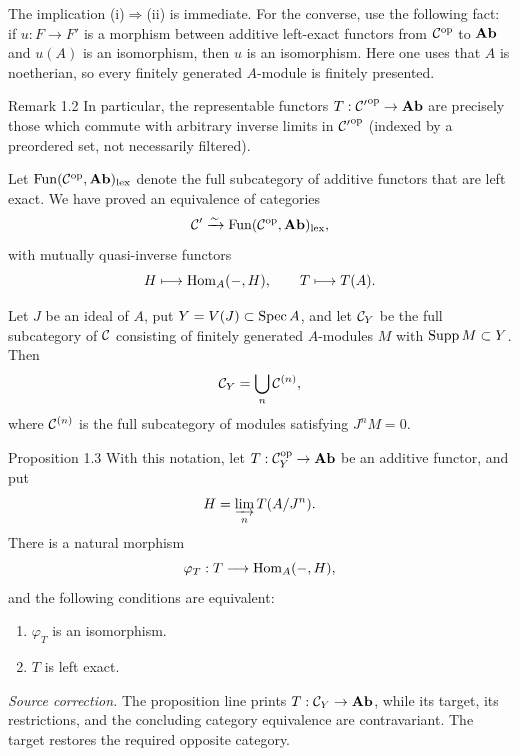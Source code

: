 The implication (i)$\Rightarrow$(ii) is immediate. For the converse, use the
following fact: if $u:F\to F'$ is a morphism between additive left-exact
functors from $\mathcal C^{\mathrm{op}}$ to $\mathbf{Ab}$ and $u(A)$ is an isomorphism,
then $u$ is an isomorphism. Here one uses that $A$ is noetherian, so every
finitely generated $A$-module is finitely presented.

\begin{sgastatement}{Remark 1.2}
In particular, the representable functors
$T:{\mathcal C'}^{\mathrm{op}}\to\mathbf{Ab}$ are precisely those which commute with
arbitrary inverse limits in ${\mathcal C'}^{\mathrm{op}}$ (indexed by a
preordered set, not necessarily filtered).
\end{sgastatement}

Let $\operatorname{Fun}(\mathcal C^{\mathrm{op}},\mathbf{Ab})_{\mathrm{lex}}$ denote the
full subcategory of additive functors that are left exact. We have proved an
equivalence of categories
\[
  \mathcal C'\xrightarrow{\sim}
  \operatorname{Fun}(\mathcal C^{\mathrm{op}},\mathbf{Ab})_{\mathrm{lex}},
\]
with mutually quasi-inverse functors
\[
  H\longmapsto\operatorname{Hom}_A(-,H),
  \qquad
  T\longmapsto T(A).
\]


Let $J$ be an ideal of $A$, put $Y=V(J)\subset\operatorname{Spec} A$, and let
$\mathcal C_Y$ be the full subcategory of $\mathcal C$ consisting of finitely generated
$A$-modules $M$ with $\operatorname{Supp} M\subset Y$. Then
\[
  \mathcal C_Y=\bigcup_n\mathcal C^{(n)},
\]
where $\mathcal C^{(n)}$ is the full subcategory of modules satisfying $J^nM=0$.

\begin{sgastatement}{Proposition 1.3}
With this notation, let
$T:\mathcal C_Y^{\mathrm{op}}\to\mathbf{Ab}$ be an additive functor, and put
\[
  H=\varinjlim_n T(A/J^n).
\]
There is a natural morphism
\[
  \varphi_T:T\longrightarrow\operatorname{Hom}_A(-,H),
\]
and the following conditions are equivalent:
\begin{enumerate}[label=\textup{\roman*)},leftmargin=2.7em]
\item $\varphi_T$ is an isomorphism.
\item $T$ is left exact.
\end{enumerate}
\end{sgastatement}

\noindent\textit{Source correction.} The proposition line prints
$T:\mathcal C_Y\to\mathbf{Ab}$, while its target, its restrictions, and the concluding
category equivalence are contravariant. The target restores the required
opposite category.

